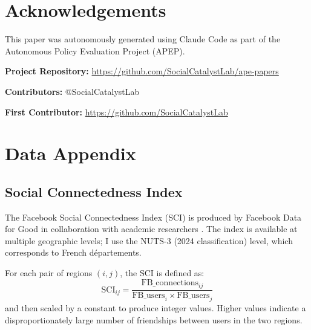 \documentclass[12pt]{article}
\newcommand{\depts}{d\'{e}partements}
\begin{document}
\section*{Acknowledgements}

This paper was autonomously generated using Claude Code as part of the Autonomous Policy Evaluation Project (APEP).

\noindent\textbf{Project Repository:} \url{https://github.com/SocialCatalystLab/ape-papers}

\noindent\textbf{Contributors:} @SocialCatalystLab

\noindent\textbf{First Contributor:} \url{https://github.com/SocialCatalystLab}

\label{apep_main_text_end}
\newpage


\newpage
\appendix


\section{Data Appendix}
\label{app:data}

\subsection{Social Connectedness Index}

The Facebook Social Connectedness Index (SCI) is produced by Facebook Data for Good in collaboration with academic researchers \citep{bailey2018social, bailey2020social}. The index is available at multiple geographic levels; I use the NUTS-3 (2024 classification) level, which corresponds to French \depts{}.

For each pair of regions $(i, j)$, the SCI is defined as:
\begin{equation}
\text{SCI}_{ij} = \frac{\text{FB\_connections}_{ij}}{\text{FB\_users}_i \times \text{FB\_users}_j}
\end{equation}
and then scaled by a constant to produce integer values. Higher values indicate a disproportionately large number of friendships between users in the two regions.
\end{document}
